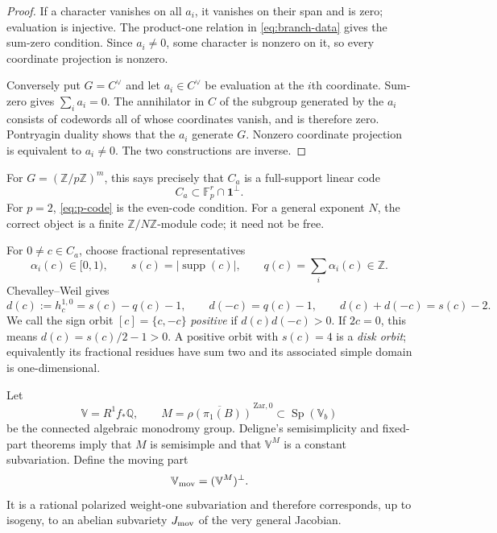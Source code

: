 \documentclass[11pt]{article}
\theoremstyle{definition}
\theoremstyle{remark}
\newcommand{\Q}{\mathbb Q}
\newcommand{\Z}{\mathbb Z}
\newcommand{\F}{\mathbb F}
\newcommand{\supp}{\operatorname{supp}}
\newcommand{\Sp}{\operatorname{Sp}}
\newcommand{\one}{\mathbf 1}
\begin{document}
\begin{proof}
If a character vanishes on all $a_i$, it vanishes on their span and is zero; evaluation is injective.  The product-one relation in \eqref{eq:branch-data} gives the sum-zero condition.  Since $a_i\ne0$, some character is nonzero on it, so every coordinate projection is nonzero.

Conversely put $G=C^\vee$ and let $a_i\in C^\vee$ be evaluation at the $i$th coordinate.  Sum-zero gives $\sum_i a_i=0$.  The annihilator in $C$ of the subgroup generated by the $a_i$ consists of codewords all of whose coordinates vanish, and is therefore zero.  Pontryagin duality shows that the $a_i$ generate $G$.  Nonzero coordinate projection is equivalent to $a_i\ne0$.  The two constructions are inverse.
\end{proof}

For $G=(\Z/p\Z)^m$, this says precisely that $C_a$ is a full-support linear code
\begin{equation}\label{eq:p-code}
 C_a\subset\F_p^r\cap\one^\perp.
\end{equation}
For $p=2$, \eqref{eq:p-code} is the even-code condition.  For a general exponent $N$, the correct object is a finite $\Z/N\Z$-module code; it need not be free.

For $0\ne c\in C_a$, choose fractional representatives
\[
 \alpha_i(c)\in[0,1),\qquad
 s(c)=|\supp(c)|,\qquad
 q(c)=\sum_i\alpha_i(c)\in\Z.
\]
Chevalley--Weil gives
\begin{equation}\label{eq:CW}
 d(c):=h^{1,0}_c=s(c)-q(c)-1,
 \qquad
 d(-c)=q(c)-1,
 \qquad
 d(c)+d(-c)=s(c)-2.
\end{equation}
We call the sign orbit $[c]=\{c,-c\}$ \emph{positive} if
$d(c)d(-c)>0$.  If $2c=0$, this means $d(c)=s(c)/2-1>0$.
A positive orbit with $s(c)=4$ is a \emph{disk orbit}; equivalently its fractional residues have sum two and its associated simple domain is one-dimensional.

Let
\[
 \mathbb V=R^1f_*\Q,
 \qquad
 M=\overline{\rho(\pi_1(B))}^{\,\mathrm{Zar},0}
 \subset\Sp(\mathbb V_b)
\]
be the connected algebraic monodromy group.  Deligne's semisimplicity and fixed-part theorems \cite{Deligne} imply that $M$ is semisimple and that $\mathbb V^M$ is a constant subvariation.  Define the moving part
\begin{equation}\label{eq:moving}
 \mathbb V_{\rm mov}=(\mathbb V^M)^\perp.
\end{equation}
It is a rational polarized weight-one subvariation and therefore corresponds, up to isogeny, to an abelian subvariety $J_{\rm mov}$ of the very general Jacobian.
\end{document}
